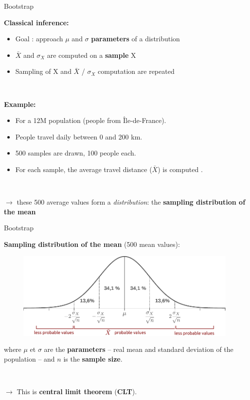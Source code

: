 \begin{frame}{Bootstrap}

\textbf{Classical inference:}
\begin{itemize}
  \item Goal : approach  $\mu$ and $\sigma$  \textbf{parameters} of a distribution
  \item $\bar{X}$ and $\sigma_X$ are computed on a \textbf{sample} X
  \item Sampling of X and $\bar{X}$ / $\sigma_X$ computation are repeated 
\end{itemize}

~

\textbf{Example:}
\begin{itemize}
  \item For a 12M population (people from Île-de-France).
  \item People travel daily  between  0 and 200 km.
  \item 500 samples are drawn,  100 people each.
  \item For each sample, the average travel distance ($\bar{X}$) is computed .
\end{itemize}

~

$\rightarrow$ these 500 average values form a \textit{distribution}: the \textbf{sampling distribution of the mean}

\end{frame}



\begin{frame}{Bootstrap}

\textbf{Sampling distribution of the mean} (500 mean values):
 
\begin{figure}
\includegraphics[width=11cm]{DensiteNormal_EN.pdf}
\end{figure}

where $\mu$ et $\sigma$ are the \textbf{parameters} --  real mean and standard deviation of the population -- and $n$ is the  \textbf{sample size}. 

~

$\rightarrow$ This is \textbf{central limit theorem} (\textbf{CLT}).

\end{frame}




